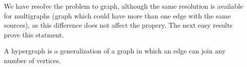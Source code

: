 We have resolve the problem to graph, although the same resolution is available for multigraphs (graph which could have more than one edge with the same sources), as this difference does not affect the propery. The next easy results prove this statment.

\begin{definition}
A hypergraph is a generalization of a graph in which an edge can join any number of vertices.
\end{definition}

